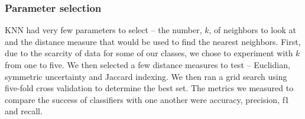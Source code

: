 \documentclass[]{report}   %
\begin{document}
\subsubsection{Parameter selection}
KNN had very few parameters to select – the number, $k$, of neighbors to look at and the distance measure that would be used to find the nearest neighbors. First, due to the scarcity of data for some of our classes, we chose to experiment with $k$ from one to five. We then selected a few distance measures to test – Euclidian, symmetric uncertainty and Jaccard indexing. We then ran a grid search using five-fold cross validation to determine the best set. The metrics we measured to compare the success of classifiers with one another were accuracy, precision, f1 and recall. 



\begin{thebibliography}{9}
\end{thebibliography}
\end{document}
